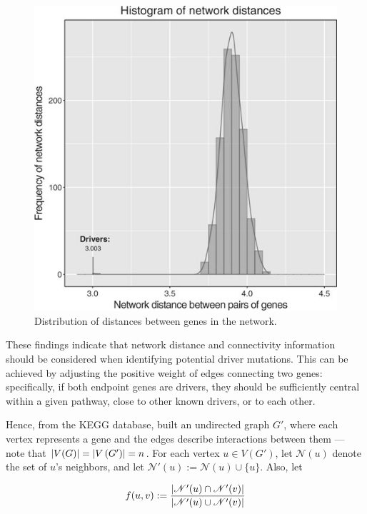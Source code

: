 \begin{figure}[H]
    \centering
    \includegraphics[scale=0.6]{../assets/frequency_c3.jpeg}
    
    \caption{Distribution of distances between genes in the network.} \label{frequency_c3}
\end{figure}

These findings indicate that network distance and connectivity information should be considered when identifying potential driver mutations. This can be achieved by adjusting the positive weight of edges connecting two genes: specifically, if both endpoint genes are drivers, they should be sufficiently central within a given pathway, close to other known drivers, or to each other.

Hence, from the KEGG \cite{kegg} database, \textcite{c3} built an undirected graph $G'$, where each vertex represents a gene and the edges describe interactions between them --- note that $\left|V(G)\right| = \left|V \left(G' \right)\right| = n$. For each vertex $u \in V \left(G' \right)$, let $\mathscr{N}(u)$ denote the set of $u$'s neighbors, and let $\mathscr{N}'(u) := \mathscr{N}(u) \cup \{u\}$. Also, let

\begin{equation}
    f(u, v) := \dfrac{\left|\mathscr{N}'(u) \cap \mathscr{N}'(v)\right|}{\left|\mathscr{N}'(u) \cup \mathscr{N}'(v)\right|}
\end{equation}

